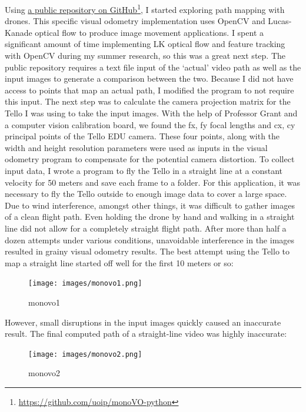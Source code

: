 Using \href{https://github.com/uoip/monoVO-python}{a public repository on GitHub}\footnote{\href{https://github.com/uoip/monoVO-python}{https:/\slash github.com\slash uoip\slash monoVO-python}}, I started exploring path mapping with drones. This specific visual odometry implementation uses OpenCV and Lucas-Kanade optical flow to produce image movement applications. I spent a significant amount of time implementing LK optical flow and feature tracking with OpenCV during my summer research, so this was a great next step. The public repository requires a text file input of the `actual' video path as well as the input images to generate a comparison between the two. Because I did not have access to points that map an actual path, I modified the program to not require this input. The next step was to calculate the camera projection matrix for the Tello I was using to take the input images. With the help of Professor Grant and a computer vision calibration board, we found the fx, fy focal lengths and cx, cy principal points of the Tello EDU camera. These four points, along with the width and height resolution parameters were used as inputs in the visual odometry program to compensate for the potential camera distortion. To collect input data, I wrote a program to fly the Tello in a straight line at a constant velocity for 50 meters and save each frame to a folder. For this application, it was necessary to fly the Tello outside to enough image data to cover a large space. Due to wind interference, amongst other things, it was difficult to gather images of a clean flight path. Even holding the drone by hand and walking in a straight line did not allow for a completely straight flight path. After more than half a dozen attempts under various conditions, unavoidable interference in the images resulted in grainy visual odometry results. The best attempt using the Tello to map a straight line started off well for the first 10 meters or so:

\begin{figure}[htbp]
\centering
\texttt{[image: images/monovo1.png]}
\caption{monovo1}
\end{figure}

However, small disruptions in the input images quickly caused an inaccurate result. The final computed path of a straight-line video was highly inaccurate:

\begin{figure}[htbp]
\centering
\texttt{[image: images/monovo2.png]}
\caption{monovo2}
\end{figure}

